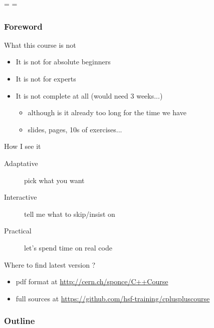 \documentclass[compress]{beamer}
\begin{document}
\showboxdepth=\maxdimen
\showboxbreadth=\maxdimen

\begin{frame}
  \titlepage
\end{frame}

\begin{frame}
  \frametitle{Foreword}
  \begin{block}{What this course is not}
    \begin{itemize}
    \item It is not for absolute beginners
    \item It is not for experts
    \item It is not complete at all (would need 3 weeks...)
      \begin{itemize}
      \item although is it already too long for the time we have
      \item \inserttotalframenumber{} slides, \insertpresentationendpage{} pages, 10s of exercises...
      \end{itemize}
    \end{itemize}
  \end{block}
  \begin{block}{How I see it}
    \begin{description}
    \item[Adaptative] pick what you want
    \item[Interactive] tell me what to skip/insist on
    \item[Practical] let's spend time on real code
    \end{description}
  \end{block}
  \begin{block}{Where to find latest version ?}
    \begin{itemize}
    \item pdf format at {\small \url{http://cern.ch/sponce/C++Course}}
    \item full sources at {\scriptsize \url{https://github.com/hsf-training/cpluspluscourse}}
    \end{itemize}
  \end{block}
\end{frame}

\begin{frame}
  \frametitle{Outline}
  \begin{multicols}{2}
    \tableofcontents[sectionstyle=show,subsectionstyle=hide]
  \end{multicols}
\end{frame}
\end{document}
